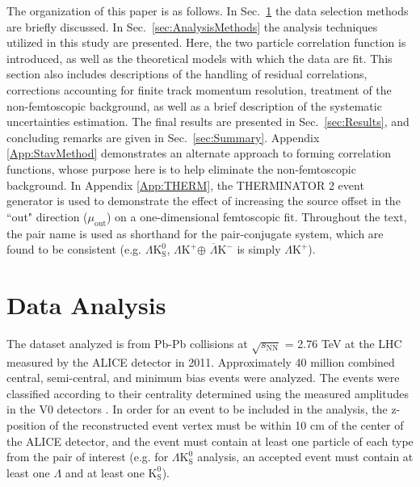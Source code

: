 \documentclass[ALICE,manyauthors]{cernphprep}
\newcommand{\Lam}{$\Lambda$\xspace}
\newcommand{\Ks}{$\mathrm{K^{0}_{S}}$\xspace}
\newcommand{\LamKchP}{$\Lambda\mathrm{K^{+}}$\xspace}
\newcommand{\ALamKchM}{$\overline{\Lambda}\mathrm{K^{-}}$\xspace}
\newcommand{\LamKs}{$\Lambda\mathrm{K^{0}_{S}}$\xspace}
\begin{document}
The organization of this paper is as follows.  
In Sec.\ \ref{sec:DataAnalysis} the data selection methods are briefly discussed.
In Sec.\ \ref{sec:AnalysisMethods} the analysis techniques utilized in this study are presented.  
Here, the two particle correlation function is introduced, as well as the theoretical models with which the data are fit.  
This section also includes descriptions of the handling of residual correlations, corrections accounting for finite track momentum resolution, treatment of the non-femtoscopic background, as well as a brief description of the systematic uncertainties estimation.  
The final results are presented in Sec.\ \ref{sec:Results}, and concluding remarks are given in Sec.\ \ref{sec:Summary}.
Appendix \ref{App:StavMethod} demonstrates an alternate approach to forming correlation functions, whose purpose here is to help eliminate the non-femtoscopic background.
{}
In Appendix \ref{App:THERM}, the THERMINATOR 2 event generator is used to demonstrate the effect of increasing the source offset in the ``out" direction ($\mu_{\mathrm{out}}$) on a one-dimensional femtoscopic fit.
Throughout the text, the pair name is used as shorthand for the pair-conjugate system, which are found to be consistent (e.g. \LamKs, \LamKchP $\oplus$ \ALamKchM is simply \LamKchP).

\section{Data Analysis}
\label{sec:DataAnalysis}

The dataset analyzed is from Pb-Pb collisions at $\sqrt{s_{\mathrm{NN}}}$ = 2.76 TeV at the LHC measured by the ALICE detector \cite{1748-0221-3-08-S08002} in 2011.
Approximately 40 million combined central, semi-central, and minimum bias events were analyzed.
The events were classified according to their centrality determined using the measured amplitudes in the V0 detectors \cite{Abelev:2013qoq}.  
In order for an event to be included in the analysis, the z-position of the reconstructed event vertex must be within 10 cm of the center of the ALICE detector, and the event must contain at least one particle of each type from the pair of interest (e.g. for \LamKs analysis, an accepted event must contain at least one \Lam and at least one \Ks). 
\end{document}
